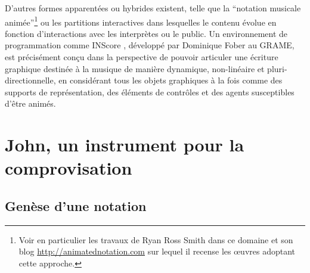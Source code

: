 \indent D'autres formes apparentées ou hybrides existent, telle que la ``notation musicale animée''\footnote{Voir en particulier les travaux de Ryan Ross Smith \cite{smith_atomic_2015} dans ce domaine et son blog \url{http://animatednotation.com} sur lequel il recense les œuvres adoptant cette approche.} ou les partitions interactives dans lesquelles le contenu évolue en fonction d'interactions avec les interprètes ou le public. Un environnement de programmation comme INScore \cite{fober_inscore-environment_2012}, développé par Dominique Fober au \gls{GRAME}, est précisément conçu dans la perspective de pouvoir articuler une écriture graphique destinée à la musique de manière dynamique, non-linéaire et pluri-directionnelle, en considérant tous les objets graphiques à la fois comme des supports de représentation, des éléments de contrôles et des agents susceptibles d'être animés.\\


\section{John, un instrument pour la comprovisation}

\subsection{Genèse d'une notation}

